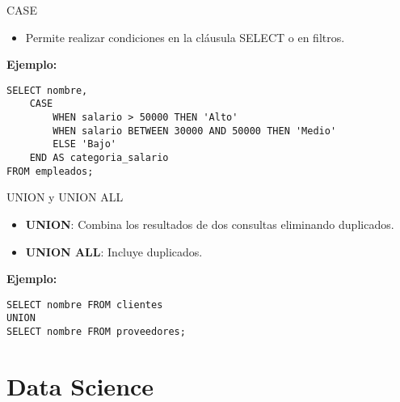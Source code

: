 \documentclass[spanish]{beamer}
\begin{document}
\begin{frame}{CASE}
    \begin{itemize}
        \item Permite realizar condiciones en la cláusula SELECT o en filtros.
    \end{itemize}
    \vspace{0.3cm}
    \textbf{Ejemplo:}
    \begin{verbatim}
SELECT nombre,
    CASE
        WHEN salario > 50000 THEN 'Alto'
        WHEN salario BETWEEN 30000 AND 50000 THEN 'Medio'
        ELSE 'Bajo'
    END AS categoria_salario
FROM empleados;
    \end{verbatim}
\end{frame}

\begin{frame}{UNION y UNION ALL}
    \begin{itemize}
        \item \textbf{UNION}: Combina los resultados de dos consultas eliminando duplicados.
        \item \textbf{UNION ALL}: Incluye duplicados.
    \end{itemize}
    \vspace{0.3cm}
    \textbf{Ejemplo:}
    \begin{verbatim}
SELECT nombre FROM clientes
UNION
SELECT nombre FROM proveedores;
    \end{verbatim}
\end{frame}




\section{Data Science}
\end{document}
